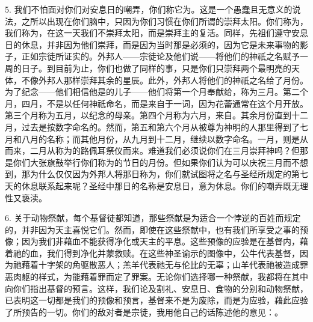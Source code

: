 5. 我们不怕面对你们对安息日的嘲弄，你们称它为。这是一个愚蠢且无意义的说法，之所以出现在你们脑中，只因为你们习惯在你们所谓的崇拜太阳。你们称为，我们称为，在这一天我们不崇拜太阳，而是崇拜主的复活。同样，先祖们遵守安息日的休息，并非因为他们崇拜，而是因为当时那是必须的，因为它是未来事物的影子，正如宗徒所证实的。外邦人——宗徒论及他们说——将他们的神祇之名赋予一周的日子。到目前为止，你们也做了同样的事，只是你们只崇拜两个最明亮的天体，不像外邦人那样崇拜其余的星辰。此外，外邦人将他们的神祇之名给了月份。为了纪念——他们相信他是的儿子——他们将第一个月奉献给，称为三月。第二个月，四月，不是以任何神祇命名，而是来自于一词，因为花蕾通常在这个月开放。第三个月称为五月，以纪念的母亲。第四个月称为六月，来自。其余月份直到十二月，过去是按数字命名的。然而，第五和第六个月从被尊为神明的人那里得到了七月和八月的名称；而其他月份，从九月到十二月，继续以数字命名。一月，则是从而来，二月从称为的路佩耳祭仪而来。难道我们必须说你们在三月崇拜神吗？但那是你们大张旗鼓举行你们称为的节日的月份。但如果你们认为可以庆祝三月而不想到，那为什么仅仅因为外邦人将那日称为，你们就试图将之名与圣经所规定的第七天的休息联系起来呢？圣经中那日的名称是安息日，意为休息。你们的嘲弄既无理性又亵渎。\par

6. 关于动物祭献，每个基督徒都知道，那些祭献是为适合一个悖逆的百姓而规定的，并非因为天主喜悦它们。然而，即使在这些祭献中，也有我们所享受之事的预像；因为我们非藉血不能获得净化或天主的平息。这些预像的应验是在基督内，藉着祂的血，我们得到净化并蒙救赎。在这些神圣谕示的图像中，公牛代表基督，因为祂藉着十字架的角驱散恶人；羔羊代表祂无与伦比的无辜；山羊代表祂被造成罪恶肉躯的样式，为能藉着罪而定了罪案。无论你们选择哪一种祭献，我都将在其中向你们指出基督的预言。这样，我们论及割礼、安息日、食物的分别和动物祭献，已表明这一切都是我们的预像和预言，基督来不是为废除，而是为应验，藉此应验了所预告的一切。你们的敌对者是宗徒，我用他自己的话陈述他的意见：。\par

